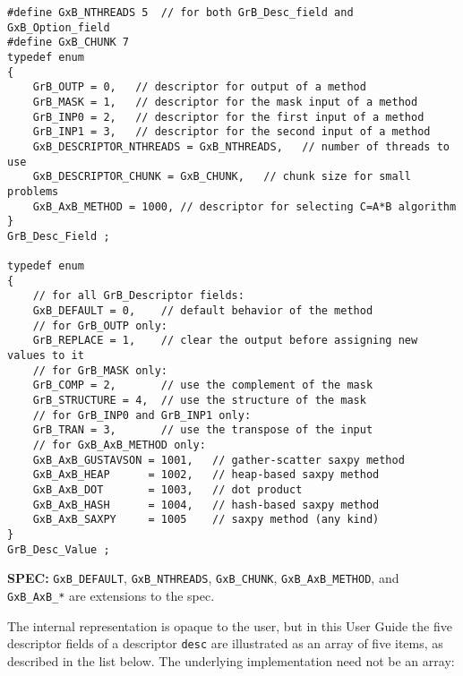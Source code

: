 \documentclass[12pt]{article}
\begin{document}
\begin{mdframed}[userdefinedwidth=6in]
{\footnotesize
\begin{verbatim}
#define GxB_NTHREADS 5  // for both GrB_Desc_field and GxB_Option_field
#define GxB_CHUNK 7
typedef enum
{
    GrB_OUTP = 0,   // descriptor for output of a method
    GrB_MASK = 1,   // descriptor for the mask input of a method
    GrB_INP0 = 2,   // descriptor for the first input of a method
    GrB_INP1 = 3,   // descriptor for the second input of a method
    GxB_DESCRIPTOR_NTHREADS = GxB_NTHREADS,   // number of threads to use
    GxB_DESCRIPTOR_CHUNK = GxB_CHUNK,   // chunk size for small problems
    GxB_AxB_METHOD = 1000, // descriptor for selecting C=A*B algorithm
}
GrB_Desc_Field ;

typedef enum
{
    // for all GrB_Descriptor fields:
    GxB_DEFAULT = 0,    // default behavior of the method
    // for GrB_OUTP only:
    GrB_REPLACE = 1,    // clear the output before assigning new values to it
    // for GrB_MASK only:
    GrB_COMP = 2,       // use the complement of the mask
    GrB_STRUCTURE = 4,  // use the structure of the mask
    // for GrB_INP0 and GrB_INP1 only:
    GrB_TRAN = 3,       // use the transpose of the input
    // for GxB_AxB_METHOD only:
    GxB_AxB_GUSTAVSON = 1001,   // gather-scatter saxpy method
    GxB_AxB_HEAP      = 1002,   // heap-based saxpy method
    GxB_AxB_DOT       = 1003,   // dot product
    GxB_AxB_HASH      = 1004,   // hash-based saxpy method
    GxB_AxB_SAXPY     = 1005    // saxpy method (any kind)
}
GrB_Desc_Value ;
\end{verbatim} } \end{mdframed}

\newpage

\begin{spec}
{\bf SPEC:} \verb'GxB_DEFAULT', \verb'GxB_NTHREADS', \verb'GxB_CHUNK',
\verb'GxB_AxB_METHOD', and \verb'GxB_AxB_*'
are extensions to the spec.
\end{spec}

The internal representation is opaque to the user, but in this User Guide the
five descriptor fields of a descriptor \verb'desc' are illustrated as an array
of five items, as described in the list below.  The underlying implementation
need not be an array:
\end{document}

